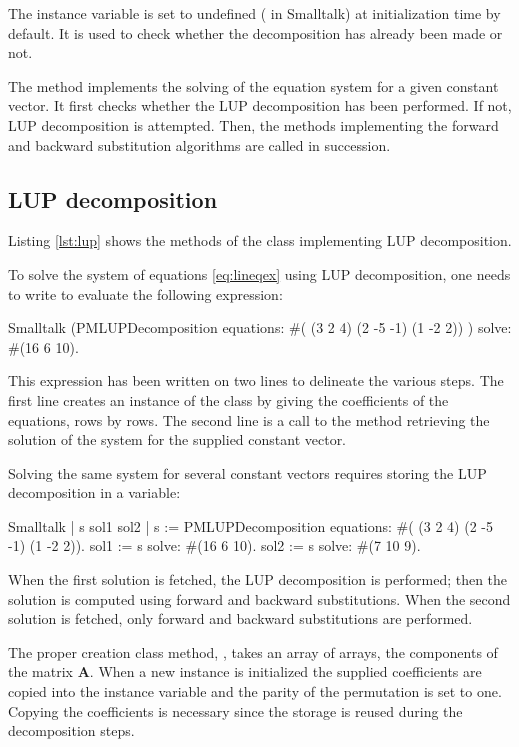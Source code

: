 The instance variable  is set to undefined ( in Smalltalk) at initialization time by default.
It is used to check whether the decomposition has already been made or not.

The method  implements the solving of the equation
system for a given constant vector. It first checks whether the
LUP decomposition has been performed. If not, LUP decomposition is
attempted. Then, the methods implementing the forward and backward
substitution algorithms are called in succession.

\subsection{LUP decomposition}
Listing \ref{lst:lup} shows the methods of the class  implementing LUP decomposition.

To solve the system of equations \ref{eq:lineqex} using LUP
decomposition, one needs to write to evaluate the following
expression:
\begin{displaycode}{Smalltalk}
 (PMLUPDecomposition equations: #( (3 2 4) (2 -5 -1) (1 -2 2)) )
            solve: #(16 6 10).
\end{displaycode}
This expression has been written on two lines to delineate the
various steps. The first line creates an instance of the class
 by giving the coefficients of the
equations, rows by rows. The second line is a call to the method
 retrieving the solution of the system for the
supplied constant vector.

Solving the same system for several constant vectors requires
storing the LUP decomposition in a variable:
\begin{displaycode}{Smalltalk}
 | s sol1 sol2 |
 s := PMLUPDecomposition equations: #( (3 2 4) (2 -5 -1) (1 -2 2)).
 sol1 := s solve: #(16 6 10).
 sol2 := s solve: #(7 10 9).
\end{displaycode}
When the first solution is fetched, the LUP decomposition is
performed; then the solution is computed using forward and
backward substitutions. When the second solution is fetched, only
forward and backward substitutions are performed.

The proper creation class method, , takes an array
of arrays, the components of the matrix $\textbf{A}$. When a new
instance is initialized the supplied coefficients are copied into
the instance variable  and the parity of the permutation
is set to one. Copying the coefficients is necessary since the
storage is reused during the decomposition steps. 

